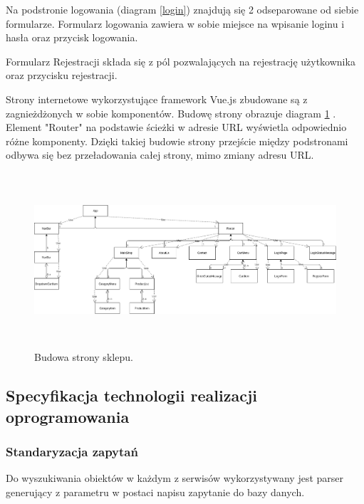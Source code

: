 \documentclass[11pt,a4paper,twoside]{article}
\begin{document}
\begin{enumerate}
Na podstronie logowania (diagram \ref{login}) znajdują się 2 odseparowane od siebie formularze. Formularz logowania zawiera w sobie miejsce na wpisanie loginu i hasła oraz przycisk logowania.

Formularz Rejestracji składa się z pól pozwalających na rejestrację użytkownika oraz przycisku rejestracji.
\end{enumerate}

Strony internetowe wykorzystujące framework Vue.js zbudowane są z zagnieżdżonych w sobie komponentów. Budowę strony obrazuje diagram \ref{frontendUML} . Element "Router" na podstawie ścieżki w adresie URL wyświetla odpowiednio różne komponenty. Dzięki takiej budowie strony przejście między podstronami odbywa się bez przeładowania całej strony, mimo zmiany adresu URL.

\begin{figure}[ht]
\caption{Budowa strony sklepu.}
\label{frontendUML}
\centering
\includegraphics[height=6.5cm, width=15.7cm]{FRONTEND_UML}
\end{figure}

\newpage
\subsection{Specyfikacja technologii realizacji oprogramowania}

\subsubsection{Standaryzacja zapytań}
\label{stdZapytan}
Do wyszukiwania obiektów w każdym z serwisów wykorzystywany jest parser generujący z parametru w postaci napisu zapytanie do bazy danych.
\end{document}
